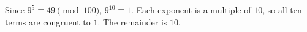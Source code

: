 Since $9^5\equiv49\pmod{100}$, $9^{10}\equiv1$. Each exponent is a multiple of $10$, so all ten terms are congruent to $1$. The remainder is $\boxed{10}$.
